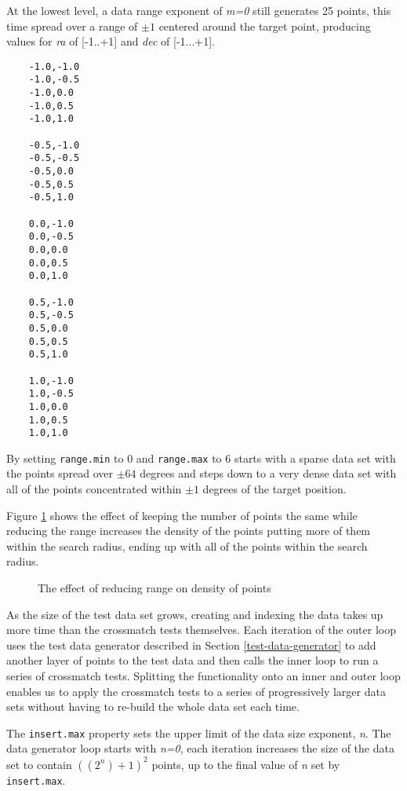 \documentclass{article}
\newcommand{\crossmatch} {crossmatch\xspace}
\begin{document}
At the lowest level, a data range exponent of \textit{m=0} still generates 25 points, this time spread over a range of $\pm1$ centered around the target point, producing values for \textit{ra} of [-1..+1] and \textit{dec} of [-1...+1].

\begin{lstlisting}
    -1.0,-1.0 
    -1.0,-0.5 
    -1.0,0.0 
    -1.0,0.5
    -1.0,1.0 

    -0.5,-1.0 
    -0.5,-0.5 
    -0.5,0.0 
    -0.5,0.5 
    -0.5,1.0 

    0.0,-1.0 
    0.0,-0.5 
    0.0,0.0
    0.0,0.5 
    0.0,1.0 

    0.5,-1.0 
    0.5,-0.5 
    0.5,0.0 
    0.5,0.5 
    0.5,1.0 

    1.0,-1.0 
    1.0,-0.5 
    1.0,0.0 
    1.0,0.5 
    1.0,1.0 
\end{lstlisting}

By setting \texttt{range.min} to 0 and \texttt{range.max} to 6 starts with a sparse data set with the points spread over $\pm64$ degrees and steps down to a very dense data set with all of the points concentrated within $\pm1$ degrees of the target position.

Figure \ref{fig:data-range-01} shows the effect of keeping the number of points the same while reducing the range increases the density of the points putting more of them within the search radius, ending up with all of the points within the search radius.

\begin{figure}[h]

\caption{The effect of reducing range on density of points}
\label{fig:data-range-01}
\end{figure}

As the size of the test data set grows, creating and indexing the data takes up more time than the \crossmatch tests themselves.
Each iteration of the outer loop uses the test data generator described in Section \ref{test-data-generator} to add another layer of points to the test data and then calls the inner loop to run a series of \crossmatch tests.
Splitting the functionality onto an inner and outer loop enables us to apply the \crossmatch tests to a series of progressively larger data sets without having to re-build the whole data set each time. 


The \texttt{insert.max} property sets the upper limit of the data size exponent, \textit{n}. The data generator loop starts with \textit{n=0}, each iteration increases the size of the data set to contain \(((2^n)+1)^2\) points, up to the final value of \textit{n} set by \texttt{insert.max}.
\end{document}

